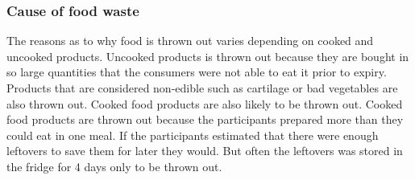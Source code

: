 \subsubsection{Cause of food waste} 
The reasons as to why food is thrown out varies depending on cooked and uncooked products. Uncooked products is thrown out because they are bought in so large quantities that the consumers were not able to eat it prior to expiry. Products that are considered non-edible such as cartilage or bad vegetables are also thrown out. Cooked food products are also likely to be thrown out. Cooked food products are thrown out because the participants prepared more than they could eat in one meal. If the participants estimated that there were enough leftovers to save them for later they would. But often the leftovers was stored in the fridge for 4 days only to be thrown out.

